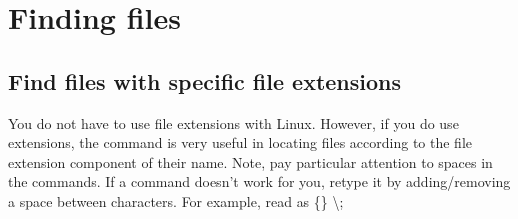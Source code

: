 \chapter{Finding files}
\label{ch:findfiles}
\pagestyle{fancy}

\fancyhf{} %
\fancyhead[OC]{\leftmark} %
\setlength{\headheight}{13.6pt} 
\cfoot{\thepage} %

\section{Find files with specific file extensions}

You do not have to use file extensions with Linux. However, if you do use extensions, the  command is very useful in locating files according to the file extension component of their name. Note, pay particular attention to spaces in the commands. If a command doesn't work for you, retype it by adding/removing a space between characters. For example, read \textbf{\tbx} as \{\} \textbackslash{};

